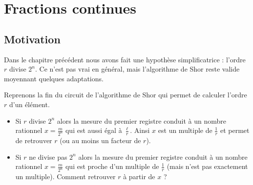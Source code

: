 \documentclass[11pt,class=report,crop=false]{standalone}
\begin{document}






\bigskip




\section{Fractions continues}


\subsection{Motivation}

Dans le chapitre précédent nous avons fait une hypothèse simplificatrice : l'ordre $r$ divise $2^n$. Ce n'est pas vrai en général, mais l'algorithme de Shor reste valide moyennant quelques adaptations.


Reprenons la fin du circuit de l'algorithme de Shor qui permet de calculer l'ordre $r$ d'un élément.
\begin{itemize}
  \item Si $r$ divise $2^n$ alors la mesure du premier registre conduit à un nombre rationnel $x = \frac{m}{2^n}$ qui est aussi égal à $\frac{\ell}{r}$.
  Ainsi $x$ est un multiple de $\frac 1r$ et permet de retrouver $r$ (ou au moins un facteur de $r$).
   
  \item Si $r$ ne divise pas $2^n$ alors la mesure du premier registre conduit à un nombre rationnel $x = \frac{m}{2^n}$ qui est proche d'un multiple de $\frac1r$ (mais n'est pas exactement un multiple). Comment retrouver $r$ à partir de $x$ ?
\end{itemize}
\end{document}
